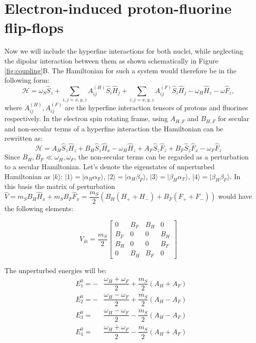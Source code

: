 \documentclass[a4paper, 12pt]{article}
\begin{document}
\section{Electron-induced proton-fluorine flip-flops}
Now we will include the hyperfine interactions for both nuclei, while neglecting the dipolar interaction between them as shown schematically in Figure \ref{fig:coupling}B. The Hamiltonian for such a system would therefore be in the following form:
\begin{equation}
\mathcal{H} =  \omega_S \hat{S}_z + \sum_{i,j=x,y,z} A_{ij}^{(H)} \hat{S}_i \hat{H}_j +  \sum_{i,j=x,y,z} A_{ij}^{(F)} \hat{S}_i \hat{H}_j - \omega_H \hat{H}_z - \omega \hat{F}_z ,
\end{equation}
where $A_{ij}^{(H)}, A_{ij}^{(F)}$ are the hyperfine interaction tensors of protons and fluorines respectively. In the electron spin rotating frame, using $A_{H,F}$ and $B_{H,F}$ for secular and non-secular terms of a hyperfine interaction the Hamiltonian can be rewritten as:
\begin{equation}
\mathcal{H}  = A_H \hat{S}_z \hat{H}_z + B_H \hat{S}_z \hat{H}_x -  \omega_H \hat{H}_z + A_F \hat{S}_z \hat{F}_z + B_F \hat{S}_z \hat{F}_x - \omega_F \hat{F}_z
\end{equation}
Since $B_H, B_F \ll \omega_H, \omega_F $, the non-secular terms can be regarded as a perturbation to a secular Hamiltonian.
Let's denote the eigenstates of unperturbed Hamiltonian as $\vert k \rangle  $: $\vert 1 \rangle = \vert \alpha_H \alpha_F \rangle$, $\vert 2 \rangle =   \vert \alpha_H \beta_F \rangle$, $\vert 3 \rangle =   \vert \beta_H \alpha_F \rangle$, $\vert 4 \rangle =   \vert \beta_H \beta_F \rangle$. In this basis the matrix of perturbation $\hat{V} = m_S B_H \hat{H}_x + m_S B_F \hat{F}_x =\dfrac{m_S}{2} ( B_H (H_{+} + H_{-})  + B_F (F_{+} + F_{-})) $ would have the following elements:

\begin{equation}
	V_{ik} = \dfrac{m_S}{2} \begin{bmatrix}
	0 & B_F & B_H & 0 \\
	B_F & 0 & 0 & B_H \\
	B_H & 0 & 0 & B_F \\
	0 & B_H & B_F & 0 
	\end{bmatrix}
\end{equation}

The unperturbed energies will be:
\begin{equation}\label{eq:level_energies}
	\begin{array}{lll}
  &E_1^{0} = - &\dfrac{\omega_H + \omega_F}{2} + \dfrac{m_S}{2}(A_H + A_F) \\
  &E_2^{0} = - &\dfrac{\omega_H - \omega_F}{2} + \dfrac{m_S}{2}(A_H - A_F) \\
  &E_3^{0} =  &\dfrac{\omega_H - \omega_F}{2} - \dfrac{m_S}{2}(A_H - A_F) \\
  &E_4^{0} =  &\dfrac{\omega_H + \omega_F}{2} - \dfrac{m_S}{2}(A_H + A_F) \\

	\end{array}
\end{equation}
\end{document}

